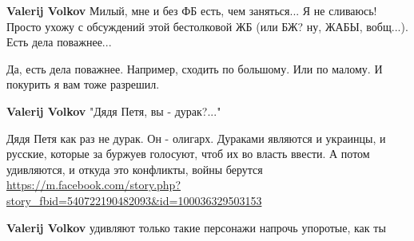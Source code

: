 \begin{itemize}
\begin{itemize}
 
\textbf{Valerij Volkov} Милый, мне и без ФБ есть, чем заняться... Я не
сливаюсь! Просто ухожу с обсуждений этой бестолковой ЖБ (или БЖ? ну, ЖАБЫ,
вобщ...). Есть дела поважнее...

 
Да, есть дела поважнее.
Например, сходить по большому. Или по малому.
И покурить я вам тоже разрешил.

 
\textbf{Valerij Volkov} "Дядя Петя, вы - дурак?..."

 
Дядя Петя как раз не дурак. Он - олигарх.
Дураками являются и украинцы, и русские, которые за буржуев голосуют, чтоб их во власть ввести. А потом удивляются, и откуда это конфликты, войны берутся
\url{https://m.facebook.com/story.php?story_fbid=540722190482093&id=100036329503153}

 
\textbf{Valerij Volkov} удивляют только такие персонажи напрочь упоротые, как ты

 

\end{itemize}
\end{itemize}
